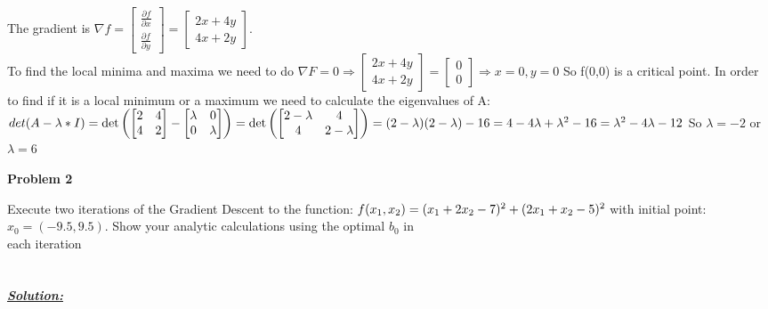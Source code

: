\documentclass{article}
\begin{document}
  \noindent The gradient is $\nabla f=
  \begin{bmatrix}
    \frac{\partial f}{\partial x} \\
    \frac{\partial f}{\partial y}
  \end{bmatrix} =
  \begin{bmatrix}
    2x+4y \\
    4x+2y
  \end{bmatrix}
  $. \\To find the local minima and maxima we need to do $\nabla F=0 \Rightarrow 
  \begin{bmatrix}
    2x+4y \\
    4x+2y
  \end{bmatrix} =
  \begin{bmatrix}
    0 \\ 0
  \end{bmatrix} \Rightarrow x=0, y=0
  $
  So f(0,0) is a critical point. In order to find if it is a local minimum or a maximum we need to calculate the eigenvalues of A:\\
  ${det(A - \lambda*I)} = \det \left ( \begin{bmatrix}
    2 & 4 \\
    4 & 2
  \end{bmatrix} 
  -\begin{bmatrix}
    \lambda & 0 \\
    0 & \lambda
  \end{bmatrix} \right )  = 
  \det \left (\begin{bmatrix}
    2-\lambda & 4 \\
    4 & 2-\lambda
\end{bmatrix} \right ) = (2-\lambda)(2-\lambda)-16=\\4-4\lambda+\lambda^2-16=\lambda^2-4\lambda-12$ 
So $\lambda = -2 $ or $\lambda = 6$






\newpage
\noindent \textbf{Problem 2}

\noindent Execute two iterations of the Gradient Descent to the function: $f(x_1,x_2) = (x_1+2x_2-7)^2 + (2x_1+ \\ x_2-5)^2$ with initial point: $x_0 = (-9.5,9.5)$. Show your analytic calculations
 using the optimal $b_0$ in \\ each iteration\\ \\ \\
\underline{\textbf{\textit{Solution:}}}
\end{document}
